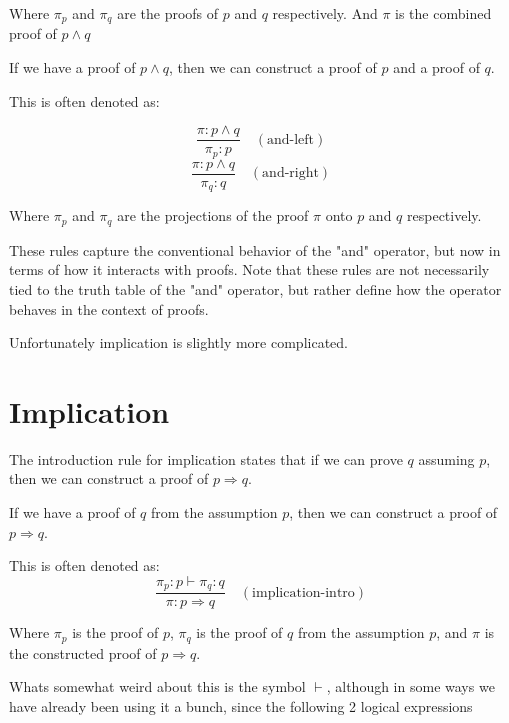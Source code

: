 Where $\pi_p$ and $\pi_q$ are the proofs of $p$ and $q$ respectively. And $\pi$ is the combined proof of $p \land q$

\begin{definition}
    If we have a proof of $p \land q$, then we can construct a proof of $p$ and a proof of $q$.
\end{definition}

This is often denoted as:


\begin{equation*}
    \frac{\pi : p \land q}{\pi_p : p}\quad(\text{and-left})
\end{equation*}
\begin{equation*}
    \frac{\pi : p \land q}{ \pi_q : q}\quad(\text{and-right})
\end{equation*}


Where $\pi_p$ and $\pi_q$ are the projections of the proof $\pi$ onto $p$ and $q$ respectively.

These rules capture the conventional behavior of the "and" operator, but now in terms of how it interacts with proofs. Note that these rules are not necessarily tied to the truth table of the "and" operator, but rather define how the operator behaves in the context of proofs.

Unfortunately implication is slightly more complicated.
\section{Implication}

The introduction rule for implication states that if we can prove $q$ assuming $p$, then we can construct a proof of $p \Rightarrow q$.

\begin{definition}
    If we have a proof of $q$ from the assumption $p$, then we can construct a proof of $p \Rightarrow q$.
\end{definition}

This is often denoted as:
\begin{equation*}
    \frac{\pi_p : p \vdash \pi_q : q}{\pi: p \Rightarrow q}\quad(\text{implication-intro})
\end{equation*}

Where $\pi_p$ is the proof of $p$, $\pi_q$ is the proof of $q$ from the assumption $p$, and $\pi$ is the constructed proof of $p \Rightarrow q$.

Whats somewhat weird about this is the symbol $\vdash$, although in some ways we have already been using it a bunch, since the following 2 logical expressions

